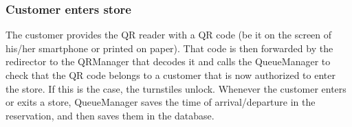 \subsubsection{Customer enters store}
\begin{figure}[H]
	\noindent
\end{figure}
The customer provides the QR reader with a QR code (be it on the screen of his/her smartphone or printed on paper). That code is then forwarded by the redirector to the QRManager that decodes it and calls the QueueManager to check that the QR code belongs to a customer that is now authorized to enter the store. If this is the case, the turnstiles unlock. Whenever the customer enters or exits a store, QueueManager saves the time of arrival/departure in the reservation, and then saves them in the database.
